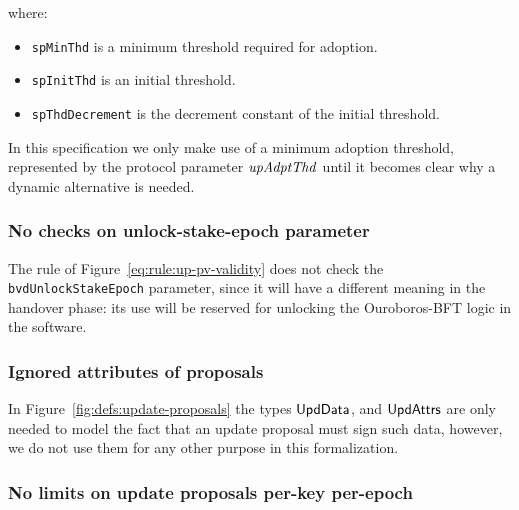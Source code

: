 where:
\begin{itemize}
\item \lstinline{spMinThd} is a minimum threshold required for adoption.
\item \lstinline{spInitThd} is an initial threshold.
\item \lstinline{spThdDecrement} is the decrement constant of the initial
  threshold.
\end{itemize}

In this specification we only make use of a minimum adoption threshold,
represented by the protocol parameter $\mathit{upAdptThd}$ until it becomes clear
why a dynamic alternative is needed.

\subsubsection{No checks on unlock-stake-epoch parameter}
\label{sec:no-unlock-stake-epoch-check}

The rule of Figure~\ref{eq:rule:up-pv-validity} does not check the
\lstinline{bvdUnlockStakeEpoch} parameter, since it will have a different
meaning in the handover phase: its use will be reserved for unlocking the
Ouroboros-BFT logic in the software.

\subsubsection{Ignored attributes of proposals}

In Figure~\ref{fig:defs:update-proposals} the types
$\mathsf{UpdData}$, and $\mathsf{UpdAttrs}$ are only needed to model the fact that
an update proposal must sign such data, however, we do not use them for any
other purpose in this formalization.

\subsubsection{No limits on update proposals per-key per-epoch}
\label{sec:no-up-limits}

